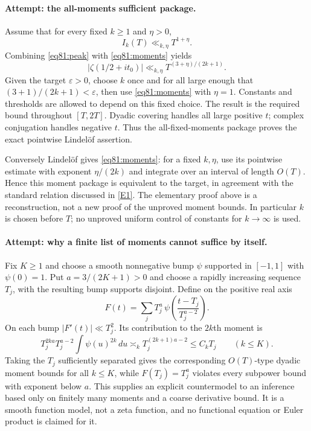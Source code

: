 \documentclass[11pt,a4paper]{article}
\numberwithin{equation}{section}
\newcommand{\eref}[2]{\hyperlink{extra:#1:#2}{[E#2]}}
\begin{document}
\paragraph{Attempt: the all-moments sufficient package.}
Assume that for every fixed $k\geq1$ and $\eta>0$,
\begin{equation}\label{eq81:moments}
 I_k(T)\ll_{k,\eta}T^{1+\eta}.
\end{equation}
Combining \eqref{eq81:peak} with \eqref{eq81:moments} yields
\[
 |\zeta(1/2+it_0)|\ll_{k,\eta}T^{(3+\eta)/(2k+1)}.
\]
Given the target $\varepsilon>0$, choose $k$ once and for all large enough
that $(3+1)/(2k+1)<\varepsilon$, then use \eqref{eq81:moments} with
$\eta=1$. Constants and thresholds are allowed to depend on this fixed
choice. The result is the required bound throughout $[T,2T]$.
Dyadic covering handles all large positive $t$; complex conjugation handles
negative $t$. Thus the all-fixed-moments package proves the exact pointwise
Lindel\"of assertion.

Conversely Lindel\"of gives \eqref{eq81:moments}: for a fixed $k,\eta$,
use its pointwise estimate with exponent $\eta/(2k)$ and integrate over
an interval of length $O(T)$. Hence this moment package is equivalent to
the target, in agreement with the standard relation discussed in
\eref{statement}{1}. The elementary proof above is a reconstruction, not a new
proof of the unproved moment bounds. In particular $k$ is chosen before
$T$; no unproved uniform control of constants for $k\to\infty$ is used.

\paragraph{Attempt: why a finite list of moments cannot suffice by itself.}
Fix $K\geq1$ and choose a smooth nonnegative bump $\psi$ supported in
$[-1,1]$ with $\psi(0)=1$. Put $a=3/(2K+1)>0$ and choose a rapidly
increasing sequence $T_j$, with the resulting bump supports disjoint.
Define on the positive real axis
\[
 F(t)=\sum_j T_j^a\,
       \psi\left(\frac{t-T_j}{T_j^{a-2}}\right).
\]
On each bump $|F'(t)|\ll T_j^2$. Its contribution to the $2k$th moment is
\[
 T_j^{2ka}T_j^{a-2}\int\psi(u)^{2k}\,du
       \asymp_k T_j^{(2k+1)a-2}\leq C_kT_j
          \qquad(k\leq K).
\]
Taking the $T_j$ sufficiently separated gives the corresponding
$O(T)$-type dyadic moment bounds for all $k\leq K$, while
$F(T_j)=T_j^a$ violates every subpower bound with exponent below $a$.
This supplies an explicit countermodel to an inference based only on
finitely many moments and a coarse derivative bound. It is a smooth
function model, not a zeta function, and no functional equation or Euler
product is claimed for it.
\end{document}
